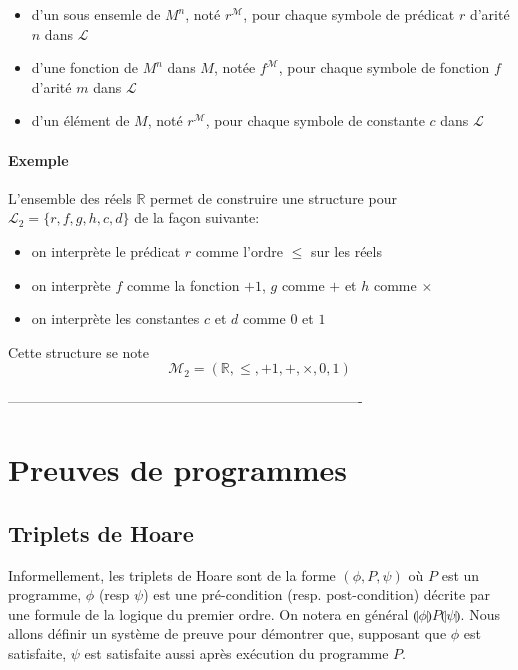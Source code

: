 \documentclass[a4paper]{article}
\begin{document}
   \begin{itemize}
     \item d'un sous ensemle de $M^n$, noté $r^{\mathcal{M}}$, pour 
chaque symbole
     de prédicat $r$ d'arité $n$ dans $\mathcal{L}$
     \item d'une fonction de $M^n$ dans $M$, notée $f^{\mathcal{M}}$, 
pour chaque symbole
     de fonction $f$ d'arité $m$ dans $\mathcal{L}$
     \item d'un élément de $M$, noté $r^{\mathcal{M}}$, pour chaque 
symbole de 
     constante $c$ dans $\mathcal{L}$
   \end{itemize}

   \paragraph{Exemple} L'ensemble des réels $\mathbb{R}$ permet de 
construire une 
   structure pour $\mathcal{L}_2 = \{r, f, g, h, c, d\}$ de la façon 
suivante:

   \begin{itemize}
     \item on interprète le prédicat $r$ comme l'ordre $\leq$ sur les 
réels
     \item on interprète $f$ comme la fonction $+1$, $g$ comme $+$ et 
$h$ comme $\times$
     \item on interprète les constantes $c$ et $d$ comme $0$ et $1$
   \end{itemize}
   Cette structure se note $$ \mathcal{M}_2 = (\mathbb{R}, \leq, +1, +, 
\times, 0, 1) $$ 


% 
---------------------------------------------------------------------------- 
%
\section{Preuves de programmes}
  \subsection{Triplets de Hoare}
  Informellement, les triplets de Hoare sont de la forme $(\phi, P, 
\psi)$ où $P$
  est un programme, $\phi$ (resp $\psi$) est une pré-condition (resp. 
post-condition) 
  décrite par une formule de la logique du premier ordre. On notera en 
général $\llparenthesis \phi\rrparenthesis P \llparenthesis 
\psi\rrparenthesis $.
  Nous allons définir un système de preuve pour démontrer que, supposant 
que $\phi$
  est satisfaite, $\psi$ est satisfaite aussi après exécution du 
programme $P$.
\end{document}
